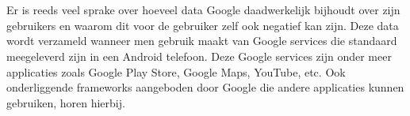 
\chapter{}
\label{ch:inleiding}




\section{}
\label{sec:probleemstelling}

Er is reeds veel sprake over hoeveel data Google daadwerkelijk bijhoudt over zijn gebruikers en waarom dit voor de gebruiker zelf ook negatief kan zijn. Deze data wordt verzameld wanneer men gebruik maakt van Google services die standaard meegeleverd zijn in een Android telefoon. Deze Google services zijn onder meer applicaties zoals Google Play Store, Google Maps, YouTube, etc. Ook onderliggende frameworks aangeboden door Google die andere applicaties kunnen gebruiken, horen hierbij. 

